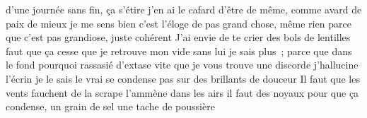 d’une journée sans fin, ça s’étire j’en ai le cafard
d’être de même, comme avard de paix de mieux
je me sens bien c’est l’éloge de pas grand chose, même rien
parce que c’est pas grandiose, juste cohérent
J’ai envie de te crier des bols de lentilles
faut que ça cesse que je retrouve mon vide
sans lui je sais plus ;
parce que dans le fond pourquoi
rassasié d’extase vite que je vous trouve une discorde
j’hallucine l’écrin je le sais
le vrai se condense pas sur des brillants de douceur
Il faut que les vents fauchent de la scrape
l’ammène dans les airs il faut des noyaux
pour que ça condense, un grain de sel
une tache de poussière
\begin{comment}
Les apartements aussi se succèdent aussi, quelques mésaventures, des
chinchillas des champignons un coloc un peu creepy mais sur l’ensemble c’est
sain c’est frais. Elle prend de la maturité comme un vent pur d’automne qui
pique le nez un peu. 
\end{comment}

